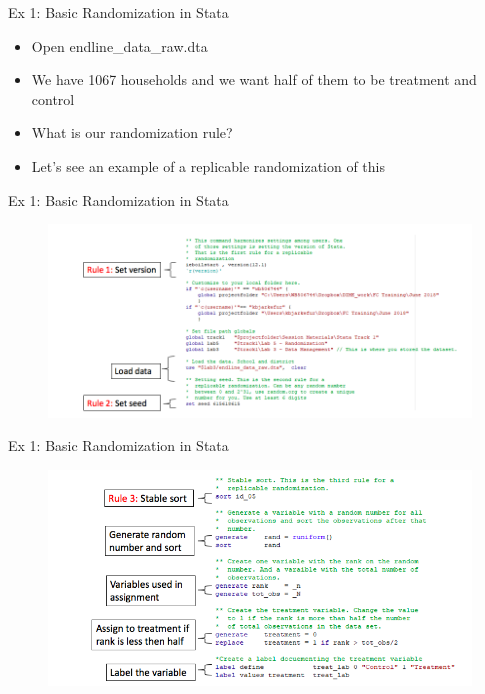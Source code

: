 \documentclass[aspectratio=169]{beamer}
\begin{document}
\begin{frame}{Ex 1: Basic Randomization in Stata}
\begin{itemize}
	\item Open endline\_data\_raw.dta
	\item We have 1067 households and we want half of them to be treatment and control
	\item What is our randomization rule?
	\item Let’s see an example of a replicable randomization of this
\end{itemize}
\end{frame}


\begin{frame}{Ex 1: Basic Randomization in Stata}
\begin{figure}
	\centering
	\includegraphics[width=\linewidth]{img/randomisation_stata}
\end{figure}
\end{frame}


\begin{frame}{Ex 1: Basic Randomization in Stata}
\begin{figure}
	\centering
	\includegraphics[width=\linewidth]{img/randomisation_stata_2}
\end{figure}
\end{frame}
\end{document}
